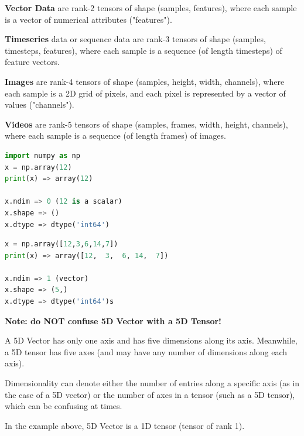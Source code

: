 {

\textbf{Vector Data} are rank-2 tensors of shape (samples, features), where each sample is a vector of numerical attributes ("features").

\textbf{Timeseries} data or sequence data are rank-3 tensors of shape (samples, timesteps, features), where each sample is a sequence (of length timesteps) of feature vectors.


\textbf{Images} are rank-4 tensors of shape (samples, height, width, channels), where each sample is a 2D grid of pixels, and each pixel is represented by a vector of values ("channels").


\textbf{Videos} are rank-5 tensors of shape (samples, frames, width, height, channels), where each sample is a sequence (of length frames) of images.


\begin{lstlisting}[language=python, breaklines=true]
import numpy as np
x = np.array(12)
print(x) => array(12)

x.ndim => 0 (12 is a scalar)
x.shape => ()
x.dtype => dtype('int64')
\end{lstlisting}
\vs


\begin{lstlisting}[language=python, breaklines=true]
x = np.array([12,3,6,14,7])
print(x) => array([12,  3,  6, 14,  7])

x.ndim => 1 (vector)
x.shape => (5,)
x.dtype => dtype('int64')s
\end{lstlisting}
\vs

\begin{aside}
    \textbf{Note: do NOT confuse 5D Vector with a 5D Tensor!}

    A 5D Vector has only one axis and has five dimensions along its axis. Meanwhile, a 5D tensor has five axes (and may have any number of dimensions along each axis).

    Dimensionality can denote either the number of entries along a specific axis (as in the case of a 5D vector) or the number of axes in a tensor (such as a 5D tensor), which can be confusing at times.

    In the example above, 5D Vector is a 1D tensor (tensor of rank 1).
\end{aside}
\vs

}
